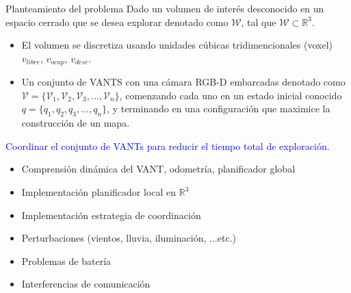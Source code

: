 \documentclass[24pt,aspectratio=169]{beamer}
\newcommand{\cmark}{{\color{green}\ding{51}}} %
\newcommand{\xmark}{{\color{red}\ding{55}}}   %
\begin{document}
\begin{frame}[fragile]{Planteamiento del problema}
  \vspace{1mm}
  \centering
  \justifying
  \footnotesize Dado un volumen de interés desconocido en un espacio cerrado que se desea explorar denotado como $\mathcal{W}$, tal que $\mathcal{W} \subset \mathbb{R}^{3}$.\\
  \begin{itemize}
  \item El volumen se discretiza usando unidades cúbicas tridimencionales (voxel) $v_{libre}$, $v_{ocup}$, $v_{desc}$.
  \item Un conjunto de VANTS con una cámara RGB-D embarcadas denotado como $\mathcal{V} = \{\mathcal{V}_{1},\mathcal{V}_{2},\mathcal{V}_{3},...,\mathcal{V}_{n}\}$, comenzando cada uno en un estado inicial conocido $q = \{q_{1},q_{2},q_{3},...,q_{n}\}$, y terminando en una configuración que maximice la construcción de un mapa.\\
  \end{itemize}

  \begin{center}
    \textcolor{blue}{Coordinar el conjunto de VANTs para reducir el tiempo total de exploración.}
  \end{center}
  
  \begin{multicols}{2}
    \begin{itemize}[label={}]
    \item \cmark { }Comprensión dinámica del VANT, odometría, planificador global
    \item \cmark { }Implementación planificador local en $\mathbb{R}^{3}$
    \item \cmark { }Implementación estrategia de coordinación
    \end{itemize}
    
    
    \begin{itemize}[label={}]
    \item \xmark { }Perturbaciones (vientos, lluvia, iluminación, ...etc.)
    \item \xmark { }Problemas de batería
    \item \xmark { }Interferencias de comunicación
    \end{itemize}
  \end{multicols}
  

\end{frame}
\end{document}
